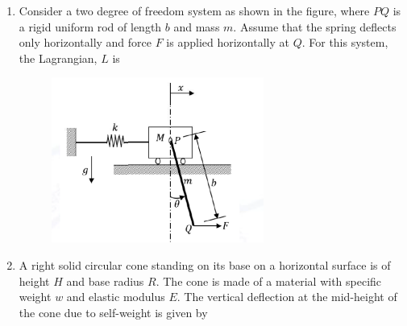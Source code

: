 \documentclass[journal]{IEEEtran}
\begin{document}
\begin{enumerate}
\item Consider a two degree of freedom system as shown in the figure, where $PQ$ is a rigid uniform rod of length $b$ and mass $m$. Assume that the spring deflects only horizontally and force $F$ is applied horizontally at $Q$. For this system, the Lagrangian, $L$ is
\begin{figure}[h]
\centering
\includegraphics[width=0.5\columnwidth]{Figs/image (50).png}
\caption*{}
\label{fig:30}
\end{figure}
\begin{enumerate}
\end{enumerate}

\hfill{}

\item A right solid circular cone standing on its base on a horizontal surface is of height $H$ and base radius $R$. The cone is made of a material with specific weight $w$ and elastic modulus $E$. The vertical deflection at the mid-height of the cone due to self-weight is given by

\begin{enumerate}
\end{enumerate}


\end{enumerate}
\end{document}
